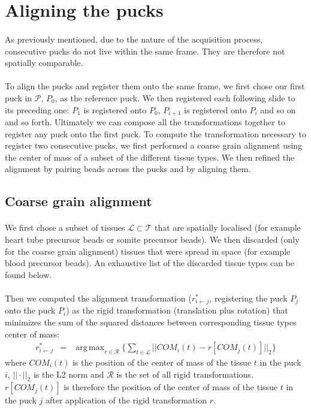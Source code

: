 \documentclass[10pt,a4paper]{article}
\DeclareMathOperator*{\argmax}{arg\,max}
\begin{document}
\section{Aligning the pucks}
\paragraph{}As previously mentioned, due to the nature of the acquisition process, consecutive pucks do not live within the same frame.
They are therefore not spatially comparable.
\paragraph{}To align the pucks and register them onto the same frame, we first chose our first puck in \(\mathcal{P}\), \(P_0\), as the reference puck.
We then registered each following slide to its preceding one: \(P_1\) is registered onto \(P_0\), \(P_{i+1}\) is registered onto \(P_{i}\) and so on and so forth.
Ultimately we can compose all the transformations together to register any puck onto the first puck.
To compute the transformation necessary to register two consecutive pucks, we first performed a coarse grain alignment using the center of mass of a subset of the different tissue types.
We then refined the alignment by pairing beads across the pucks and by aligning them.
\subsection{Coarse grain alignment}
\paragraph{}We first chose a subset of tissues \(\mathcal{L}\subset\mathcal{T}\) that are spatially localised (for example heart tube precursor beads or somite precursor beads).
We then discarded (only for the coarse grain alignment) tissues that were spread in space (for example blood precursor beads).
An exhaustive list of the discarded tissue types can be found below.
\paragraph{}Then we computed the alignment transformation (\(r_{i\leftarrow j}^*\), registering the puck \(P_j\) onto the puck \(P_i\)) as the rigid transformation (translation plus rotation) that minimizes the sum of the squared distances between corresponding tissue types center of mass:
\begin{eqnarray}\label{eq:rigid}
r_{i\leftarrow j}^*&=&\argmax_{r\in\mathcal{R}} \big\{\sum_{t\in \mathcal{L}}||COM_i(t)-r[COM_j(t)]||_2\big\}
\end{eqnarray}
where \(COM_i(t)\) is the position of the center of mass of the tissue \(t\) in the puck \(i\), \(||\cdot||_2\) is the L2 norm and \(\mathcal{R}\) is the set of all rigid transformations.
\(r[COM_j(t)]\) is therefore the position of the center of mass of the tissue \(t\) in the puck \(j\) after application of the rigid transformation \(r\).
\end{document}
